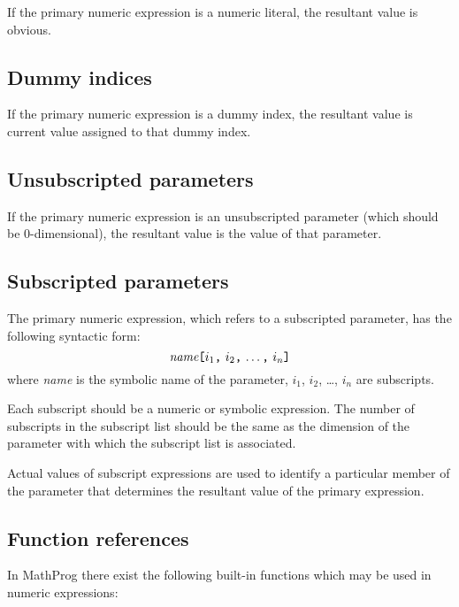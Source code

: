 \documentclass[11pt]{report}
\begin{document}
If the primary numeric expression is a numeric literal, the resultant
value is obvious.

\subsection{Dummy indices}

If the primary numeric expression is a dummy index, the resultant value
is current value assigned to that dummy index.

\subsection{Unsubscripted parameters}

If the primary numeric expression is an unsubscripted parameter (which
should be 0-dimen\-sional), the resultant value is the value of that
parameter.

\subsection{Subscripted parameters}

The primary numeric expression, which refers to a subscripted
parameter, has the following syntactic form:
$$
\mbox{{\it name}{\tt[}$i_1${\tt,} $i_2${\tt,} \dots{\tt,} $i_n${\tt]}}
$$
where {\it name} is the symbolic name of the parameter, $i_1$, $i_2$,
\dots, $i_n$ are subscripts.

Each subscript should be a numeric or symbolic expression. The number
of subscripts in the subscript list should be the same as the dimension
of the parameter with which the subscript list is associated.

Actual values of subscript expressions are used to identify
a particular member of the parameter that determines the resultant
value of the primary expression.

\newpage

\subsection{Function references}

In MathProg there exist the following built-in functions which may be
used in numeric expressions:
\end{document}
